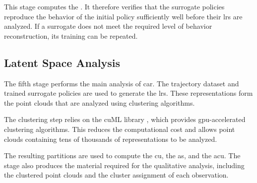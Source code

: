 This stage computes the \BehaviorReconstructionName.
It therefore verifies that the surrogate policies reproduce the behavior of the initial policy sufficiently well before their \glspl{lr} are analyzed.
If a surrogate does not meet the required level of behavior reconstruction, its training can be repeated.

\subsection{Latent Space Analysis}

The fifth stage performs the main analysis of \gls{car}.
The trajectory dataset and trained surrogate policies are used to generate the \glspl{lr}.
These representations form the point clouds that are analyzed using clustering algorithms.

The clustering step relies on the cuML library \parencite{raschka2020cuml}, which provides \gls{gpu}-accelerated clustering algorithms.
This reduces the computational cost and allows point clouds containing tens of thousands of representations to be analyzed.

The resulting partitions are used to compute the \gls{cu}, the \gls{as}, and the \gls{acu}.
The stage also produces the material required for the qualitative analysis, including the clustered point clouds and the cluster assignment of each observation.
